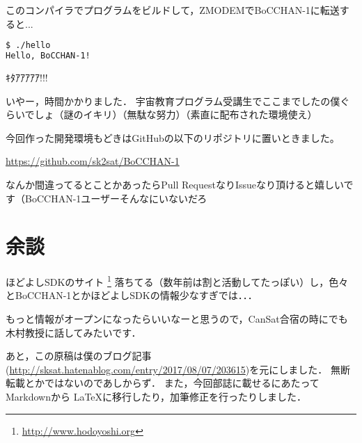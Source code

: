 このコンパイラでプログラムをビルドして，ZMODEMでBoCCHAN-1に転送すると...

\begin{lstlisting}[language=sh]
$ ./hello
Hello, BoCCHAN-1!
\end{lstlisting}

ｷﾀｱｱｱｱｱ!!!

いやー，時間かかりました．
宇宙教育プログラム受講生でここまでしたの僕ぐらいでしょ（謎のイキリ）（無駄な努力）（素直に配布された環境使え）

今回作った開発環境もどきはGitHubの以下のリポジトリに置いときました。

\url{https://github.com/sk2sat/BoCCHAN-1}

なんか間違ってるとことかあったらPull RequestなりIssueなり頂けると嬉しいです（BoCCHAN-1ユーザーそんなにいないだろ

\section{余談}

ほどよしSDKのサイト
\footnote{\url{http://www.hodoyoshi.org}}
落ちてる（数年前は割と活動してたっぽい）し，色々とBoCCHAN-1とかほどよしSDKの情報少なすぎでは．．．

もっと情報がオープンになったらいいなーと思うので，CanSat合宿の時にでも木村教授に話してみたいです．

あと，この原稿は僕のブログ記事(\url{http://sksat.hatenablog.com/entry/2017/08/07/203615})を元にしました．
無断転載とかではないのであしからず．
また，今回部誌に載せるにあたってMarkdownから \LaTeX に移行したり，加筆修正を行ったりしました．

